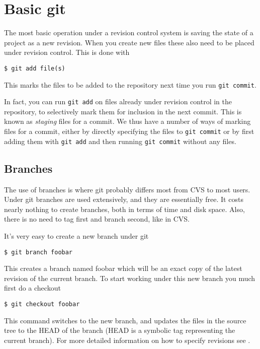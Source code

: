 \documentclass[a4paper,10pt]{article}
\begin{document}
\section{Basic git}
The most basic operation under a revision control system is saving the state of
a project as a new revision. When you create new files  
these also need to be placed under revision control. This is done with
\begin{verbatim}
$ git add file(s)
\end{verbatim}
This marks the files to be added to the repository next time you run 
\texttt{git commit}. 

In fact, you can run \texttt{git add} on files already
under revision control in the repository, to selectively mark them for
inclusion in the next commit. This is known as \emph{staging} files for a
commit. We thus have a number of ways of marking files for a commit, either by
directly specifying the files to \texttt{git commit} or by first adding them
with \texttt{git add} and then running \texttt{git commit} without any files. 

\subsection{Branches}
The use of branches is where git probably differs most from CVS to most users.
Under git branches are used extensively, and they are essentially
free. It costs nearly nothing to create branches, both in terms of time and
disk space. Also, there is no need to tag first and branch second, like in CVS.

It's very easy to create a new branch under git
\begin{verbatim}
$ git branch foobar
\end{verbatim}
This creates a branch named foobar which will be an exact copy of the latest
revision of the current branch. To start working under this new branch you
much first do a checkout
\begin{verbatim}
$ git checkout foobar
\end{verbatim}
This command switches to the new branch, and updates the files in the source
tree to the HEAD of the branch (HEAD is a symbolic tag representing
the current branch). For more detailed information on
how to specify revisions see .
\end{document}
